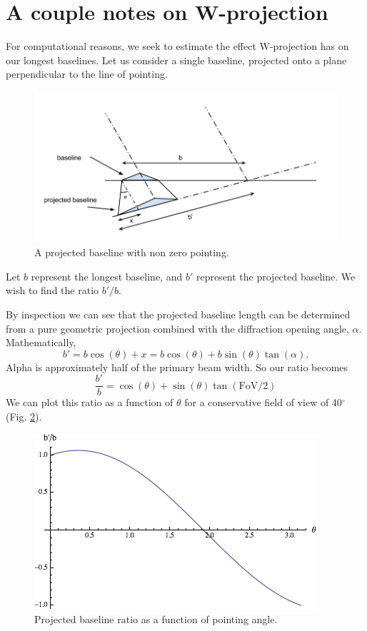 \documentclass{article}
\begin{document}
\section{A couple notes on W-projection}
For computational reasons, we seek to estimate the effect W-projection has on our longest baselines. Let us consider a single baseline, projected onto a plane perpendicular to the line of pointing.
\begin{figure}[h!]
\includegraphics[width=\columnwidth]{W_projection.png}
\caption{A projected baseline with non zero pointing.}
\label{fig:proj_base}
\end{figure}
Let $b$ represent the longest baseline, and $b'$ represent the projected baseline. We wish to find the ratio $b'/b$.

By inspection we can see that the projected baseline length can be determined from a pure geometric projection combined with the diffraction opening angle, $\alpha$. Mathematically,
\begin{equation}
b' = b\cos(\theta) + x = b\cos(\theta) + b\sin(\theta)\tan(\alpha).
\end{equation}
Alpha is approximately half of the primary beam width. So our ratio becomes
\begin{equation} \label{eq:bprimeb}
\frac{b'}{b} = \cos(\theta) + \sin(\theta)\tan(\mathrm{FoV}/2)
\end{equation}
We can plot this ratio as a function of $\theta$ for a conservative field of view of 40$^{\circ}$ (Fig. \ref{fig:bprimeb}).
\begin{figure}[h!] 
\includegraphics[width=\columnwidth]{bprimeb.png}
\caption{Projected baseline ratio as a function of pointing angle.}
\label{fig:bprimeb}
\end{figure}
\end{document}
